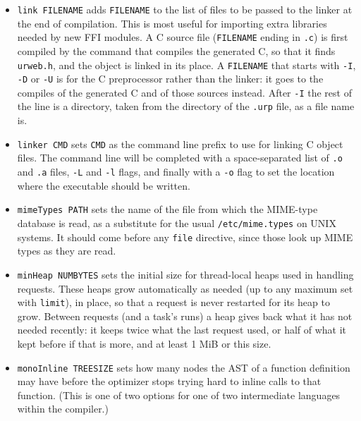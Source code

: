 \documentclass{article}
\begin{document}
\begin{itemize}
\begin{itemize}
  \item \texttt{time}: maximum running time of a single page request, in units of approximately 0.1 seconds
  \item \texttt{transactionals}: maximum number of custom transactional actions (e.g., sending an e-mail) that may be run in a single page generation
  \end{itemize}
\item \texttt{link FILENAME} adds \texttt{FILENAME} to the list of files to be passed to the linker at the end of compilation.  This is most useful for importing extra libraries needed by new FFI modules.  A C source file (\texttt{FILENAME} ending in \texttt{.c}) is first compiled by the command that compiles the generated C, so that it finds \texttt{urweb.h}, and the object is linked in its place.  A \texttt{FILENAME} that starts with \texttt{-I}, \texttt{-D} or \texttt{-U} is for the C preprocessor rather than the linker: it goes to the compiles of the generated C and of those sources instead.  After \texttt{-I} the rest of the line is a directory, taken from the directory of the \texttt{.urp} file, as a file name is.
\item \texttt{linker CMD} sets \texttt{CMD} as the command line prefix to use for linking C object files.  The command line will be completed with a space-separated list of \texttt{.o} and \texttt{.a} files, \texttt{-L} and \texttt{-l} flags, and finally with a \texttt{-o} flag to set the location where the executable should be written.
\item \texttt{mimeTypes PATH} sets the name of the file from which the MIME-type database is read, as a substitute for the usual \texttt{/etc/mime.types} on UNIX systems.  It should come before any \texttt{file} directive, since those look up MIME types as they are read.
\item \texttt{minHeap NUMBYTES} sets the initial size for thread-local heaps used in handling requests.  These heaps grow automatically as needed (up to any maximum set with \texttt{limit}), in place, so that a request is never restarted for its heap to grow.  Between requests (and a task's runs) a heap gives back what it has not needed recently: it keeps twice what the last request used, or half of what it kept before if that is more, and at least 1 MiB or this size.
\item \texttt{monoInline TREESIZE} sets how many nodes the AST of a function definition may have before the optimizer stops trying hard to inline calls to that function.  (This is one of two options for one of two intermediate languages within the compiler.)

\end{itemize}
\end{document}

